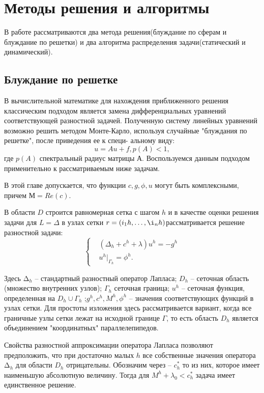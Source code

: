 \chapter{Методы решения и алгоритмы}
В работе рассматриваются два метода решения(блуждание по сферам и блуждание по решетки) и два алгоритма распределения задачи(статический и динамический).
\section{Блуждание по решетке}
\label{Bl}
В вычислительной математике для нахождения приближенного решения классическим подходом является замена дифференциальных уравнений соответствующей разностной задачей. Полученную систему линейных уравнений возможно решить методом Монте-Карло, используя случайные "блуждания по решетке", после приведения ее к специ-
альному виду:
\begin{equation}
	u = Au + f, p(A) < 1,
\end{equation}
где $p(A)$  спектральный радиус матрицы А. Воспользуемся данным подходом применительно к рассматриваемым ниже задачам.

В этой главе допускается, что функции $c, g, \phi, u$ могут быть комплексными, причем $М = Re(c)$.

В области $D$ строится равномерная сетка с шагом $h$ и в качестве
оценки решения задачи для $L = \Delta $ в узлах сетки $r=(i_{1}h,\dots,\i_{n}h) $рассматривается решение разностной задачи:
\begin{equation} 
	\left\{
\begin{aligned}
& (\Delta_{h}+c^{h}+\lambda)u^{h}=-g^{h}\\ & u^{h}|_{\Gamma_{h}}=\phi^{h}.
\end{aligned}
 \right. 
 \label{qw1}
 \end{equation}
 
Здесь $∆_{h} $ -- стандартный разностный оператор Лапласа; $D_{h}$ -- сеточная область (множество внутренних узлов); $Γ_{h}$  сеточная граница; $u^{h}$ --  сеточная функция, определенная на $D_{h} \cup \Gamma_{h}$ ;$g^{h},c^{h},M^{h},\phi^{h}$ -- значения соответствующих функций в узлах сетки. Для простоты изложения здесь
рассматривается вариант, когда все граничные узлы сетки лежат на исходной границе $Γ$, то есть область $D_{h}$ является объединением "координатных" параллелепипедов.

Свойства разностной аппроксимации оператора Лапласа позволяют
предположить, что при достаточно малых $h$ все собственные значения
оператора $∆_{h}$ для области $D_{h}$ отрицательны. Обозначим через -- $c^{*}_{h}$ то из них, которое имеет наименьшую абсолютную величину. Тогда для $ M^{h}+\lambda_{0} < c^{*}_{h} $
задача имеет единственное решение.

